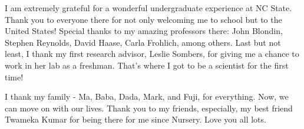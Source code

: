 \begin{acknowledgments}
I am extremely grateful for a wonderful undergraduate experience at NC State. 
Thank you to everyone there for not only welcoming me to school but to the United States! Special thanks to my amazing professors there: John Blondin, Stephen Reynolds, David Haase, Carla Frohlich, among others. Last but not least, I thank my first research advisor, Leslie Sombers, for giving me a chance to work in her lab as a freshman. That's where I got to be a scientist for the first time!

I thank my family - Ma, Baba, Dada, Mark, and Fuji, for everything. Now, we can move on with our lives. 
Thank you to my friends, especially, my 
best friend Twameka Kumar for being there for me since Nursery.  
Love you all lots.


\end{acknowledgments}